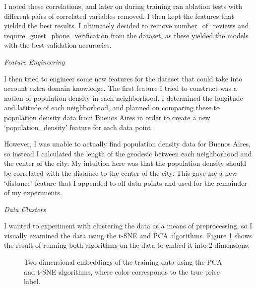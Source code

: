 \documentclass{ws-ijprai}
\newcommand{\subsubheader}[1]{\smallskip\begin{center}\textit{#1}\end{center}}
\begin{document}
I noted these correlations, and later on during training ran ablation tests with different pairs of correlated variables removed. I then kept the features that yielded the best results. I ultimately decided to remove number\_of\_reviews and require\_guest\_phone\_verification from the dataset, as these yielded the models with the best validation accuracies.

\subsubheader{Feature Engineering}

I then tried to engineer some new features for the dataset that could take into account extra domain knowledge. The first feature I tried to construct was a notion of population density in each neighborhood. I determined the longitude and latitude of each neighborhood, and planned on comparing these to population density data from Buenos Aires in order to create a new `population\_density' feature for each data point.

However, I was unable to actually find population density data for Buenos Aires, so instead I calculated the length of the geodesic between each neighborhood and the center of the city. My intuition here was that the population density should be correlated with the distance to the center of the city. This gave me a new `distance' feature that I appended to all data points and used for the remainder of my experiments.

\subsubheader{Data Clusters}

I wanted to experiment with clustering the data as a means of preprocessing, so I visually examined the data using the t-SNE and PCA algorithms. Figure \ref{fig:cluster-labels} shows the result of running both algorithms on the data to embed it into 2 dimensions.

\begin{figure}[H]
  \centering
  \caption{Two-dimensional embeddings of the training data using the PCA and t-SNE algorithms, where color corresponds to the true price label.}
  \label{fig:cluster-labels}
\end{figure}
\end{document}
